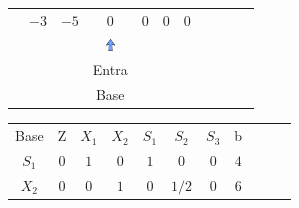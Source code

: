 \begin{frame}
{\begin{table}
\begin{tabular}{c c c c c c c c c c c}
				& \cellcolor{yellow!50} $\scriptstyle -3$
				& \cellcolor{gray!50} $\scriptstyle -5$
				& \cellcolor{yellow!50} $\scriptstyle 0$
				& \cellcolor{yellow!50} $\scriptstyle 0$
				& \cellcolor{yellow!50} $\scriptstyle 0$
				& \cellcolor{gray!50} $\scriptstyle 0$ 
				&
				&
				& \\
				\cline{1-8} 
				& 
				& 
				& \includegraphics[width=0.3cm,height=0.3cm]{setacima.jpg}
				& 
				& 
				& 
				&  
				&
				&
				& \\ 
				& 
				& 
				& \scriptsize \color{red} Entra 
				& 
				& 
				& 
				&  
				&
				&
				& \\
				& 
				& 
				& \scriptsize \color{red} Base 
				& 
				& 
				& 
				&  
				&
				&
				& \\
			\end{tabular}
		\end{table}			
	}	
	{		
		\begin{table}		
			\begin{tabular}{c c c c c c c c c c c}
				\cline{1-8} 
				\cellcolor{blue!100} \color{white} \scriptsize Base 
				&\cellcolor{blue!100} \color{white} \scriptsize Z 
				&\cellcolor{blue!100} \color{white} $\scriptstyle X_1$ 
				&\cellcolor{blue!100} \color{red} $\scriptstyle X_2$ 
				&\cellcolor{blue!100} \color{red} $\scriptstyle S_1$ 
				&\cellcolor{blue!100} \color{white} $\scriptstyle S_2$ 
				&\cellcolor{blue!100} \color{red} $\scriptstyle S_3$ 
				&\cellcolor{blue!100} \color{white} \scriptsize b
				&
				&
				& \\
				\cline{1-8}
				\cellcolor{blue!100} \color{red} $\scriptstyle S_1$
				& \cellcolor{yellow!50} $\scriptstyle 0$
				& \cellcolor{yellow!50} $\scriptstyle 1$
				& \cellcolor{yellow!50} $\scriptstyle 0$
				& \cellcolor{yellow!50} $\scriptstyle 1$
				& \cellcolor{yellow!50} $\scriptstyle 0$
				& \cellcolor{yellow!50} $\scriptstyle 0$
				& \cellcolor{yellow!50} $\scriptstyle 4$
				&
				&
				& \\
				\cline{1-8} 
			    \cellcolor{blue!100} \color{red} $\scriptstyle X_2$
				& \cellcolor{yellow!50} $\scriptstyle 0$
				& \cellcolor{yellow!50} $\scriptstyle 0$
				& \cellcolor{yellow!50} $\scriptstyle 1$
				& \cellcolor{yellow!50} $\scriptstyle 0$			
				& \cellcolor{yellow!50} $\scriptstyle 1/2$
				& \cellcolor{yellow!50} $\scriptstyle 0$
				& \cellcolor{yellow!50} $\scriptstyle 6$
				&
				&
				& \\

\end{tabular}
\end{table}}
\end{frame}

